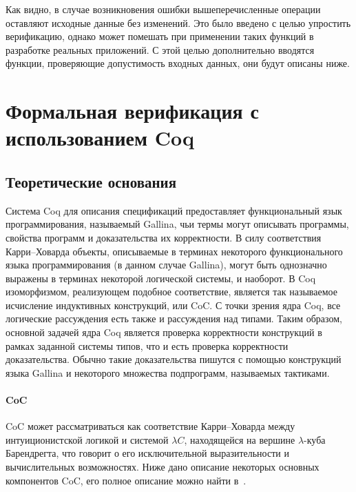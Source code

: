 Как видно, в случае возникновения ошибки вышеперечисленные операции оставляют исходные данные без изменений. Это было введено с целью упростить верификацию, однако может помешать при применении таких функций в разработке реальных приложений. С этой целью дополнительно вводятся функции, проверяющие допустимость входных данных, они будут описаны ниже.

\section{Формальная верификация с использованием Coq}

\subsection{Теоретические основания}

Система Coq для описания спецификаций предоставляет функциональный язык программирования, называемый Gallina, чьи термы могут описывать программы, свойства программ и доказательства их корректности. В силу соответствия Карри--Ховарда объекты, описываемые в терминах некоторого функционального языка программирования (в данном случае Gallina), могут быть однозначно выражены в терминах некоторой логической системы, и наоборот. В Coq изоморфизмом, реализующем подобное соответствие, является так называемое исчисление индуктивных конструкций, или CoC. С точки зрения ядра Coq, все логические рассуждения есть также и рассуждения над типами. Таким образом, основной задачей ядра Coq является проверка корректности конструкций в рамках заданной системы типов, что и есть проверка корректности доказательства. Обычно такие доказательства пишутся с помощью конструкций языка Gallina и некоторого множества подпрограмм, называемых тактиками.

\paragraph{CoC} CoC может рассматриваться как соответствие Карри--Ховарда между интуиционистской логикой и системой $\lambda C$, находящейся на вершине $\lambda$-куба Барендрегта, что говорит о его исключительной выразительности и вычислительных возможностях. Ниже дано описание некоторых основных компонентов CoC, его полное описание можно найти в~\autocite{CoqManual}.

